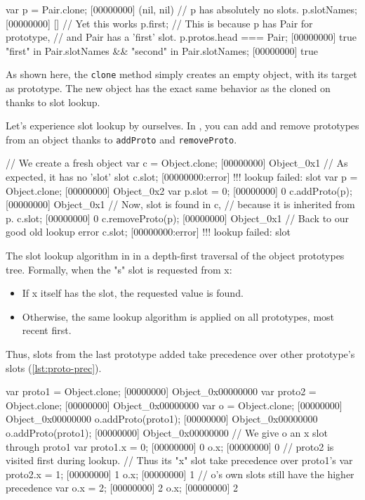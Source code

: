 \documentclass[openright,twoside,12pt]{report}
\begin{document}
\begin{urbiscript}[caption=Slot found by lookup, label=lst:simple-lookup]
var p = Pair.clone;
[00000000] (nil, nil)
// p has absolutely no slots.
p.slotNames;
[00000000] []
// Yet this works
p.first;
// This is because p has Pair for prototype,
// and Pair has a 'first' slot.
p.protos.head === Pair;
[00000000] true
"first" in Pair.slotNames && "second" in Pair.slotNames;
[00000000] true
\end{urbiscript}

As shown here, the \texttt{clone} method simply creates an empty
object, with its target as prototype. The new object has the exact
same behavior as the cloned on thanks to slot lookup.

Let's experience slot lookup by ourselves. In \urbi, you can add and
remove prototypes from an object thanks to \texttt{addProto} and
\texttt{removeProto}.

\begin{urbiscript}[caption=Manipulating prototypes, label=lst:proto-change]
// We create a fresh object
var c = Object.clone;
[00000000] Object_0x1
// As expected, it has no 'slot' slot
c.slot;
[00000000:error] !!! lookup failed: slot
var p = Object.clone;
[00000000] Object_0x2
var p.slot = 0;
[00000000] 0
c.addProto(p);
[00000000] Object_0x1
// Now, slot is found in c,
// because it is inherited from p.
c.slot;
[00000000] 0
c.removeProto(p);
[00000000] Object_0x1
// Back to our good old lookup error
c.slot;
[00000000:error] !!! lookup failed: slot
\end{urbiscript}

The slot lookup algorithm in \urbi in a depth-first traversal of the
object prototypes tree. Formally, when the "s" slot is requested from
x:

\begin{itemize}
\item If x itself has the slot, the requested value is found.
\item Otherwise, the same lookup algorithm is applied on all
  prototypes, most recent first.
\end{itemize}

Thus, slots from the last prototype added take precedence over other
prototype's slots (\autoref{lst:proto-prec}).

\begin{urbiscript}[caption=Prototype precedence, label=lst:proto-prec]
var proto1 = Object.clone;
[00000000] Object_0x00000000
var proto2 = Object.clone;
[00000000] Object_0x00000000
var o = Object.clone;
[00000000] Object_0x00000000
o.addProto(proto1);
[00000000] Object_0x00000000
o.addProto(proto1);
[00000000] Object_0x00000000
// We give o an x slot through proto1
var proto1.x = 0;
[00000000] 0
o.x;
[00000000] 0
// proto2 is visited first during lookup.
// Thus its "x" slot take precedence over proto1's
var proto2.x = 1;
[00000000] 1
o.x;
[00000000] 1
// o's own slots still have the higher precedence
var o.x = 2;
[00000000] 2
o.x;
[00000000] 2
\end{urbiscript}
\end{document}
